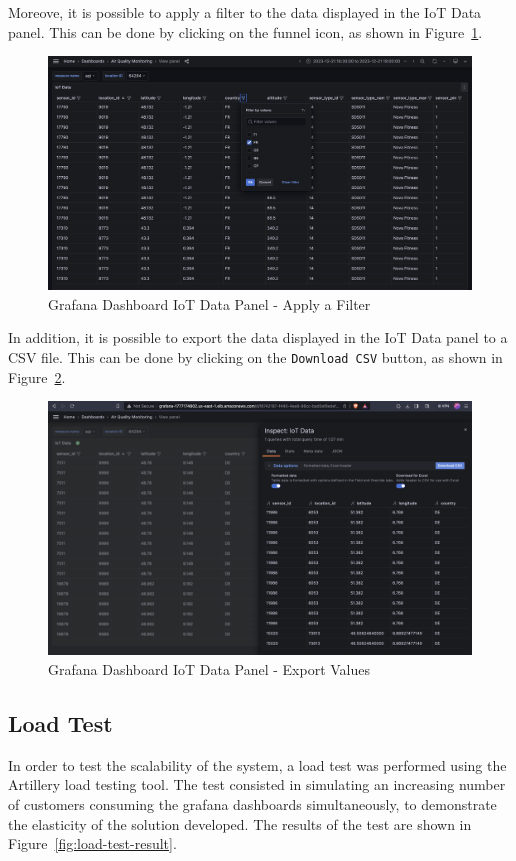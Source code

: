 \documentclass[12pt,oneside]{book} %
\begin{document}
Moreove, it is possible to apply a filter to the data displayed in the IoT Data
panel. This can be done by clicking on the funnel icon, as shown in
Figure~\ref{fig:grafana-iot-data-panel-filter}.
\begin{figure}[H]
    \centering
    \includegraphics[width=1\linewidth]{images/filter.png}
    \caption{Grafana Dashboard IoT Data Panel - Apply a Filter}\label{fig:grafana-iot-data-panel-filter}
\end{figure}

\newpage
In addition, it is possible to export the data displayed in the IoT Data panel to a CSV file. This can be done by clicking on the \texttt{Download CSV} button, as shown in Figure~\ref{fig:grafana-iot-data-panel-export}.
\begin{figure}[H]
    \centering
    \includegraphics[width=1\linewidth]{images/export-2.png}
    \caption{Grafana Dashboard IoT Data Panel - Export Values}\label{fig:grafana-iot-data-panel-export}
\end{figure}

\newpage
\subsection{Load Test}
In order to test the scalability of the system, a load test was performed using
the Artillery load testing tool. The test consisted in simulating an increasing
number of customers consuming the grafana dashboards simultaneously, to
demonstrate the elasticity of the solution developed. The results of the test
are shown in Figure~\ref{fig:load-test-result}.
\end{document}
